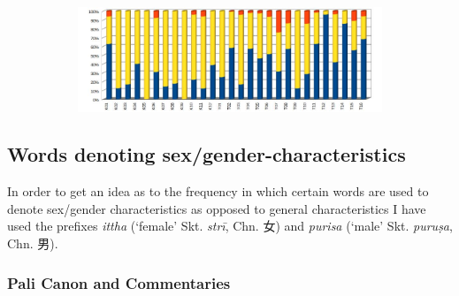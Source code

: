 \begin{figure}[!h]
  \begin{subfigure}{\linewidth}
  \begin{center}
    \includegraphics[width=0.9\linewidth]{tibetan_perc.jpg}
  \end{center}
  \end{subfigure}
\setcounter{figure}{9}
\label{tibetan2}
\end{figure}

\newpage
\subsection{Words denoting sex/gender-characteristics}
\label{appendix2b}

In order to get an idea as to the frequency in which certain words are used to denote sex/gender characteristics as opposed to general characteristics I have used the prefixes \textit{ittha} (`female' Skt. \textit{strī}, Chn. 女) and \textit{purisa} (`male' Skt. \textit{puruṣa}, Chn. 男). 

\subsubsection*{Pali Canon and Commentaries}

